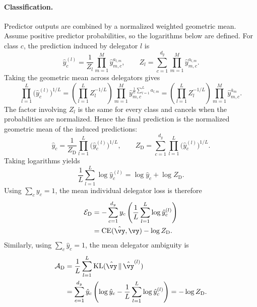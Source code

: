 \documentclass[10pt]{article} %
\newcommand{\dambiguity}{\mathcal{A}_{\mathrm{D}}}
\newcommand{\dperformance}{\mathcal{E}_{\mathrm{D}}}
\begin{document}
\paragraph{Classification.}
Predictor outputs are combined by a normalized weighted geometric mean. Assume positive predictor probabilities, so the logarithms below are defined. For class $c$, the prediction induced by delegator $l$ is
\begin{equation}
    \hat y_c^{(l)}
    =\frac{1}{Z_l}\prod_{m=1}^M\hat y_{m,c}^{a_{l,m}},
    \qquad
    Z_l=\sum_{c=1}^{d_y}\prod_{m=1}^M\hat y_{m,c}^{a_{l,m}}.
\end{equation}
Taking the geometric mean across delegators gives
\begin{equation}
    \prod_{l=1}^L\big(\hat y_c^{(l)}\big)^{1/L}
    =\left(\prod_{l=1}^L Z_l^{-1/L}\right)
      \prod_{m=1}^M\hat y_{m,c}^{\frac{1}{L}\sum_{l=1}^L a_{l,m}}
    =\left(\prod_{l=1}^L Z_l^{-1/L}\right)
      \prod_{m=1}^M\hat y_{m,c}^{\bar a_m}.
\end{equation}
The factor involving $Z_l$ is the same for every class and cancels when the probabilities are normalized. Hence the final prediction is the normalized geometric mean of the induced predictions:
\begin{equation}
    \hat y_c=\frac{1}{Z_{\mathrm{D}}}
      \prod_{l=1}^L\big(\hat y_c^{(l)}\big)^{1/L},
    \qquad
    Z_{\mathrm{D}}=\sum_{c=1}^{d_y}
      \prod_{l=1}^L\big(\hat y_c^{(l)}\big)^{1/L}.
\end{equation}
Taking logarithms yields
\begin{equation}
    \frac{1}{L}\sum_{l=1}^L\log\hat y_c^{(l)}
    =\log\hat y_c+\log Z_{\mathrm{D}}.
\end{equation}
Using $\sum_c y_c=1$, the mean individual delegator loss is therefore
\begin{equation}
\begin{aligned}
    \dperformance
    &=-\sum_{c=1}^{d_y}y_c
       \left(\frac{1}{L}\sum_{l=1}^L\log\hat y_c^{(l)}\right)\\
    &=\mathrm{CE}(\hat{\vy},\vy)-\log Z_{\mathrm{D}}.
\end{aligned}
\end{equation}
Similarly, using $\sum_c\hat y_c=1$, the mean delegator ambiguity is
\begin{equation}
\begin{aligned}
    \dambiguity
    &=\frac{1}{L}\sum_{l=1}^L
      \mathrm{KL}(\hat{\vy}\,\|\,\hat{\vy}^{(l)})\\
    &=\sum_{c=1}^{d_y}\hat y_c
      \left(\log\hat y_c-\frac{1}{L}\sum_{l=1}^L\log\hat y_c^{(l)}\right)
      =-\log Z_{\mathrm{D}}.
\end{aligned}
\end{equation}
\end{document}
